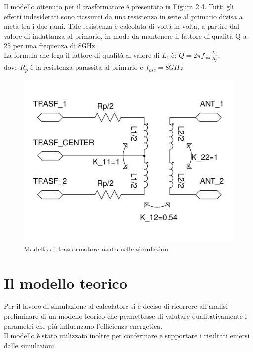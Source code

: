 \documentclass[a4paper, 12pt]{memoir}
\begin{document}
Il modello ottenuto per il trasformatore è presentato in Figura 2.4.
Tutti gli effetti indesiderati sono riassunti da una resistenza in serie al
primario divisa a metà tra i due rami. Tale resistenza è calcolata di volta in
volta, a partire dal valore di induttanza al primario, in modo da mantenere il
fattore di qualità Q a 25 per una frequenza di 8GHz.\\
La formula che lega il fattore di qualità al valore di $L_1$ è:
$ Q = 2\pi f_{osc} \frac{L_1}{R_p} $,\\
dove $R_p$ è la resistenza parassita al primario e $ f_{osc}=8GHz $.
\begin{figure}[h]
\centering
\includegraphics[height=0.34\textheight]{images/trasf_model.pdf}
\caption{Modello di trasformatore usato nelle simulazioni}
\end{figure}
\clearpage %

\section{Il modello teorico}
Per il lavoro di simulazione al calcolatore si è deciso di ricorrere 
all'analisi preliminare di un modello teorico che permettesse di valutare
qualitativamente i parametri che più influenzano l'efficienza energetica.\\
Il modello è stato utilizzato inoltre per confermare e supportare i risultati
emersi dalle simulazioni.
\end{document}
